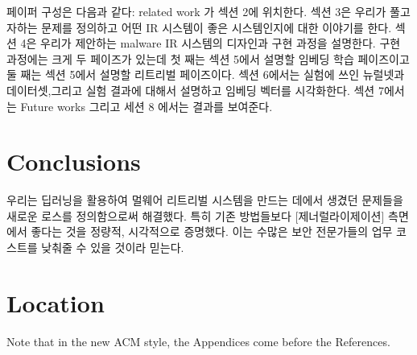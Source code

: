 페이퍼 구성은 다음과 같다: related work 가 섹션 2에 위치한다. 섹션 3은 우리가 풀고자하는 문제를 정의하고 어떤 IR 시스템이 좋은 시스템인지에 대한 이야기를 한다. 섹션 4은 우리가 제안하는 malware IR 시스템의 디자인과 구현 과정을 설명한다. 구현 과정에는 크게 두 페이즈가 있는데 첫 째는 섹션 5에서 설명할 임베딩 학습 페이즈이고 둘 째는 섹션 5에서 설명할 리트리벌 페이즈이다. 섹션 6에서는 실험에 쓰인 뉴럴넷과 데이터셋,그리고 실험 결과에 대해서 설명하고 임베딩 벡터를 시각화한다. 섹션 7에서는 Future works 그리고 세션 8 에서는 결과를 보여준다. 













\section{Conclusions}

우리는 딥러닝을 활용하여 멀웨어 리트리벌 시스템을 만드는 데에서 생겼던 문제들을 새로운 로스를 정의함으로써 해결했다. 특히 기존 방법들보다 [제너럴라이제이션] 측면에서 좋다는 것을 정량적, 시각적으로 증명했다. 이는 수많은 보안 전문가들의 업무 코스트를 낮춰줄 수 있을 것이라 믿는다.

\appendix

\section{Location}

Note that in the new ACM style, the Appendices come before the References.


\begin{acks}
\end{acks}
